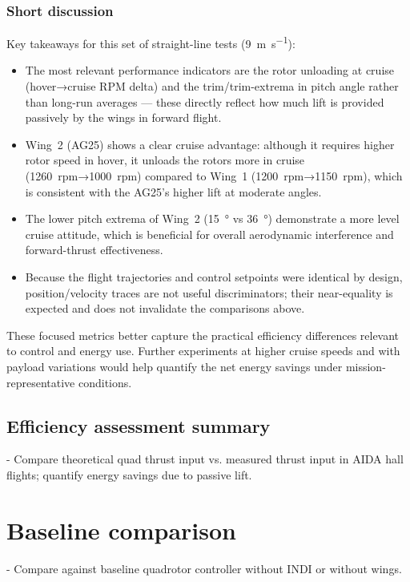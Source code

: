 \subsubsection{Short discussion}

Key takeaways for this set of straight-line tests (\SI{9}{\meter\per\second}):
\begin{itemize}
  \item The most relevant performance indicators are the rotor unloading at cruise (hover→cruise RPM delta) and the trim/trim-extrema in pitch angle rather than long-run averages — these directly reflect how much lift is provided passively by the wings in forward flight.
  \item Wing~2 (AG25) shows a clear cruise advantage: although it requires higher rotor speed in hover, it unloads the rotors more in cruise (\SI{1260}{rpm}→\SI{1000}{rpm}) compared to Wing~1 (\SI{1200}{rpm}→\SI{1150}{rpm}), which is consistent with the AG25's higher lift at moderate angles.
  \item The lower pitch extrema of Wing~2 (\SI{15}{\degree} vs \SI{36}{\degree}) demonstrate a more level cruise attitude, which is beneficial for overall aerodynamic interference and forward-thrust effectiveness.
  \item Because the flight trajectories and control setpoints were identical by design, position/velocity traces are not useful discriminators; their near-equality is expected and does not invalidate the comparisons above.
\end{itemize}

These focused metrics better capture the practical efficiency differences relevant to control and energy use. Further experiments at higher cruise speeds and with payload variations would help quantify the net energy savings under mission-representative conditions.

\subsection{Efficiency assessment summary}
- Compare theoretical quad thrust input vs. measured thrust input in AIDA hall flights; quantify energy savings due to passive lift.

\section{Baseline comparison}
- Compare against baseline quadrotor controller without INDI or without wings.
